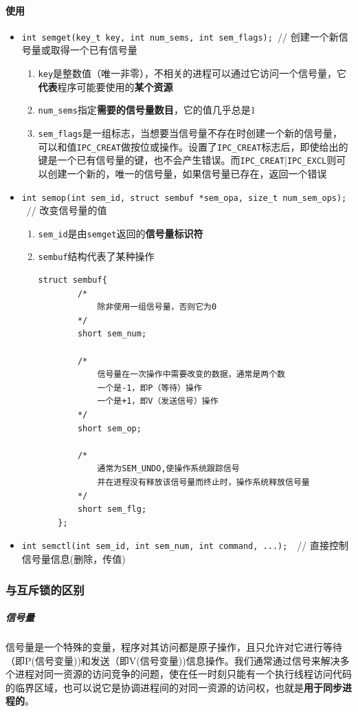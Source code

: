 \documentclass[UTF8,a4paper,8pt]{ctexbook}
\begin{document}
				\paragraph{使用}
					\begin{itemize}
						\item \verb|int semget(key_t key, int num_sems, int sem_flags); |// 创建一个新信号量或取得一个已有信号量
							\begin{enumerate}
								\item \verb|key|是整数值（唯一非零），不相关的进程可以通过它访问一个信号量，它\textbf{代表}程序可能要使用的\textbf{某个资源}
								\item \verb|num_sems|指定\textbf{需要的信号量数目}，它的值几乎总是1
								\item \verb|sem_flags|是一组标志，当想要当信号量不存在时创建一个新的信号量，可以和值\verb|IPC_CREAT|做按位或操作。设置了\verb|IPC_CREAT|标志后，即使给出的键是一个已有信号量的键，也不会产生错误。而\verb|IPC_CREAT||\verb|IPC_EXCL|则可以创建一个新的，唯一的信号量，如果信号量已存在，返回一个错误
							\end{enumerate}
						\item \verb|int semop(int sem_id, struct sembuf *sem_opa, size_t num_sem_ops);|  // 改变信号量的值
							\begin{enumerate}
								\item \verb|sem_id|是由\verb|semget|返回的\textbf{信号量标识符}
								\item \verb|sembuf|结构代表了某种操作
									\begin{lstlisting}[frame=L,xleftmargin=.05\textwidth]
	struct sembuf{  
		/*
			除非使用一组信号量，否则它为0 
		*/
		short sem_num; 
		
		/*
			信号量在一次操作中需要改变的数据，通常是两个数
			一个是-1，即P（等待）操作
			一个是+1，即V（发送信号）操作
		*/
		short sem_op;
		
		/*
			通常为SEM_UNDO,使操作系统跟踪信号
			并在进程没有释放该信号量而终止时，操作系统释放信号量
		*/ 
		short sem_flg;
	};  
									\end{lstlisting}
							\end{enumerate}
						\item \verb|int semctl(int sem_id, int sem_num, int command, ...);|  // 直接控制信号量信息(删除，传值)
					\end{itemize}
			
			\subsubsection{与互斥锁的区别}
				\subparagraph{信号量}
					信号量是一个特殊的变量，程序对其访问都是原子操作，且只允许对它进行等待（即P(信号变量))和发送（即V(信号变量))信息操作。我们通常通过信号来解决多个进程对同一资源的访问竞争的问题，使在任一时刻只能有一个执行线程访问代码的临界区域，也可以说它是协调进程间的对同一资源的访问权，也就是\textbf{用于同步进程的}。
			
\end{document}
